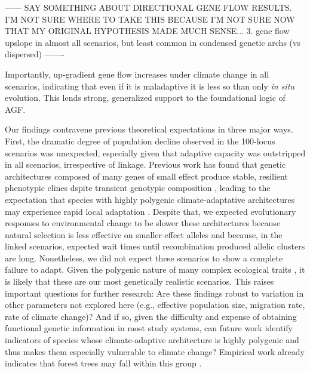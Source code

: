 \documentclass[9pt,twocolumn,twoside,lineno]{pnas-new}
\begin{document}
------
SAY SOMETHING ABOUT DIRECTIONAL GENE FLOW RESULTS. I'M NOT SURE WHERE TO TAKE THIS BECAUSE
I'M NOT SURE NOW THAT MY ORIGINAL HYPOTHESIS MADE MUCH SENSE...
 3. gene flow upslope in almost all scenarios, but least common in condensed genetic archs (vs dispersed)
-------


Importantly, up-gradient gene flow increases under climate change in all scenarios,
indicating that even if it is maladaptive it is less so than only \textit{in situ} evolution.
This lends strong, generalized support to the foundational logic of AGF.


Our findings contravene previous theoretical expectations in
three major ways.
First, the dramatic degree of population decline observed in the 100-locus scenarios was unexpected,
especially given that adaptive capacity was outstripped in all scenarios, irrespective of 
linkage.
Previous work has found that genetic architectures composed
of many genes of small effect produce stable, resilient phenotypic clines dspite transient genotypic composition \cite{yeaman_amnat,yeaman_review},
leading to the expectation that species with highly polygenic climate-adaptative architectures 
may experience rapid local adaptation \cite{aitken_yeaman}. 
Despite that, we expected evolutionary responses to environmental change
to be slower these architectures
because natural selection is less effective on smaller-effect alleles
and because, in the linked scenarios,
expected wait times until recombination produced allelic clusters are long.
Nonetheless, we did not expect these scenarios to show a complete failure to adapt.
Given the polygenic nature of many complex ecological traits \cite{barghi_polygenic,boyle,rockman,savolainen,sella},
it is likely that these are our most genetically realistic scenarios.
This raises important questions for further research:
Are these findings robust to variation in other parameters
not explored here (e.g., effective population size, migration rate, rate of climate change)? 
And if so,
given the difficulty and expense of obtaining functional genetic
information in most study systems,
can future work identify indicators of species whose
climate-adaptive architecture is highly polygenic
and thus makes them especially vulnerable to climate change?
Empirical work already indicates
that forest trees may fall within this group
\cite{lind,aitken_yeaman}.
\end{document}
